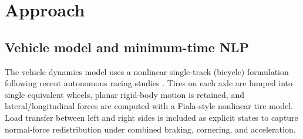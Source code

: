 \documentclass{article}
\begin{document}
%
%

\section{Approach}
\label{sec:approach}

\subsection{Vehicle model and minimum-time NLP}

The vehicle dynamics model uses a nonlinear single-track (bicycle) formulation following recent autonomous racing studies \cite{subositsgerdes2021fidelity,aggarwal2025friction}. Tires on each axle are lumped into single equivalent wheels, planar rigid-body motion is retained, and lateral/longitudinal forces are computed with a Fiala-style nonlinear tire model. Load transfer between left and right sides is included as explicit states to capture normal-force redistribution under combined braking, cornering, and acceleration.
\end{document}
